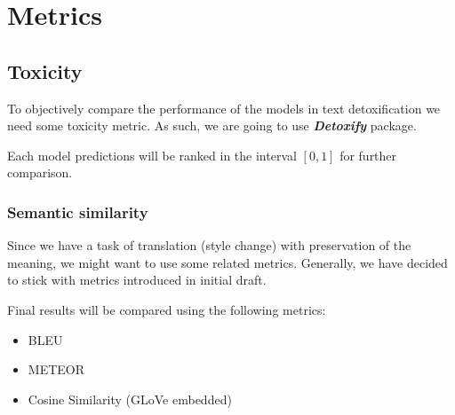 \section{Metrics}

\subsection{Toxicity}

To objectively compare the performance of the models in text detoxification we
need some toxicity metric. As such, we are going to use
\textbf{\textit{Detoxify}} package.

Each model predictions will be ranked in the interval \([0, 1]\) for further
comparison.

\subsubsection{Semantic similarity}

Since we have a task of translation (style change) with preservation of the
meaning, we might want to use some related metrics. Generally, we have decided
to stick with metrics introduced in initial draft.

Final results will be compared using the following metrics:

\begin{itemize}
    \item BLEU
    \item METEOR
    \item Cosine Similarity (GLoVe embedded)
\end{itemize}